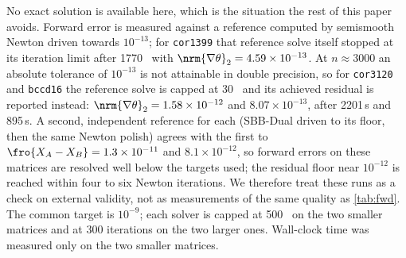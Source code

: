 No exact solution is available here, which is the situation the rest of this
paper avoids. Forward error is measured against a reference computed by
semismooth Newton driven towards $10^{-13}$; for \texttt{cor1399} that
reference solve itself stopped at its iteration limit after 1770 \EVDs\ with
$\nrm{\nabla\theta}_2=4.59\times10^{-13}$. At $n\approx3000$ an absolute
tolerance of $10^{-13}$ is not attainable in double precision, so for
\texttt{cor3120} and \texttt{bccd16} the reference solve is capped at 30
\EVDs\ and its achieved residual is reported instead:
$\nrm{\nabla\theta}_2=1.58\times10^{-12}$ and $8.07\times10^{-13}$, after
2201\,s and 895\,s. A second, independent reference for each (SBB-Dual driven
to its floor, then the same Newton polish) agrees with the first to
$\fro{X_A-X_B}=1.3\times10^{-11}$ and $8.1\times10^{-12}$, so forward errors on
these matrices are resolved well below the targets used; the residual floor
near $10^{-12}$ is reached within four to six Newton iterations. We therefore treat
these runs as a check on external
validity, not as measurements of the same quality as \cref{tab:fwd}. The common
target is $10^{-9}$; each solver is capped at 500 \EVDs\ on the two smaller
matrices and at 300 iterations on the two larger ones. Wall-clock time was
measured only on the two smaller matrices.

